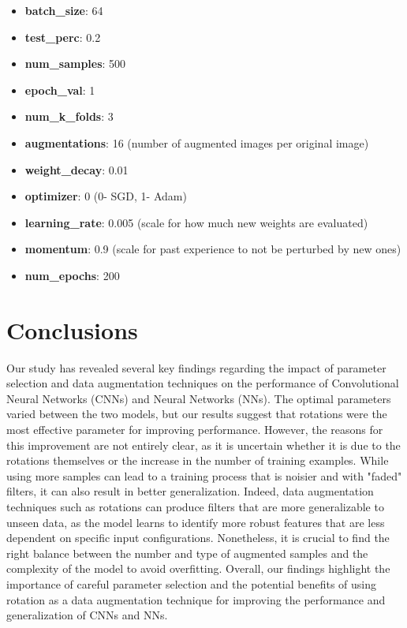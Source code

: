 \documentclass{report}
\begin{document}
\begin{itemize}
  \item \textbf{batch\_size}: 64
  \item \textbf{test\_perc}: 0.2
  \item \textbf{num\_samples}: 500
  \item \textbf{epoch\_val}: 1
  \item \textbf{num\_k\_folds}: 3
  \item \textbf{augmentations}: 16 (number of augmented images per original image)
  \item \textbf{weight\_decay}: 0.01
  \item \textbf{optimizer}: 0 (0- SGD, 1- Adam)
  \item \textbf{learning\_rate}: 0.005 (scale for how much new weights are evaluated)
  \item \textbf{momentum}: 0.9 (scale for past experience to not be perturbed by new ones)
  \item \textbf{num\_epochs}: 200
\end{itemize}
\pagebreak
\chapter{Conclusions}

Our study has revealed several key findings regarding the impact of parameter selection and data augmentation 
techniques on the performance of Convolutional Neural Networks (CNNs) and Neural Networks (NNs). The optimal 
parameters varied between the two models, but our results suggest that rotations were the most effective 
parameter for improving performance. However, the reasons for this improvement are not entirely clear, as it is 
uncertain whether it is due to the rotations themselves or the increase in the number of training examples. 
While using more samples can lead to a training process that is noisier and with "faded" filters, it can also 
result in better generalization. Indeed, data augmentation techniques such as rotations can produce filters that 
are more generalizable to unseen data, as the model learns to identify more robust features that are less 
dependent on specific input configurations. Nonetheless, it is crucial to find the right balance between the 
number and type of augmented samples and the complexity of the model to avoid overfitting. Overall, our findings 
highlight the importance of careful parameter selection and the potential benefits of using rotation as a data 
augmentation technique for improving the performance and generalization of CNNs and NNs.
\end{document}
